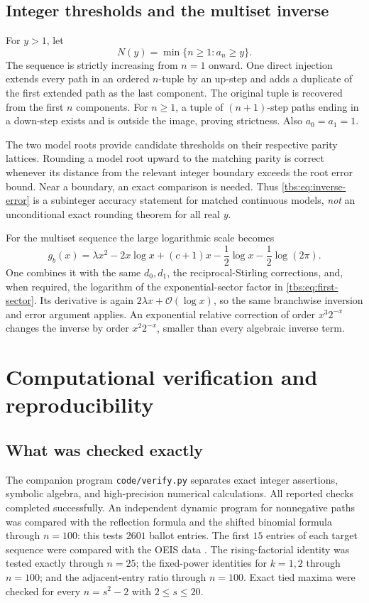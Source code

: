 \documentclass[11pt,a4paper]{article}
\numberwithin{equation}{section}
\theoremstyle{definition}
\newcommand{\OO}{\mathcal O}
\newcommand{\code}[1]{\texttt{#1}}
\begin{document}
\subsection{Integer thresholds and the multiset inverse}
For $y>1$, let
\[
 N(y)=\min\{n\ge1:a_n\ge y\}.
\]
The sequence is strictly increasing from $n=1$ onward. One direct
injection extends every path in an ordered $n$-tuple by an up-step and
adds a duplicate of the first extended path as the last component.
The original tuple is recovered from the first $n$ components. For
$n\ge1$, a tuple of $(n+1)$-step paths ending in a down-step exists and
is outside the image, proving strictness. Also $a_0=a_1=1$.

The two model roots provide candidate thresholds on their respective
parity lattices. Rounding a model root upward to the matching parity is
correct whenever its distance from the relevant integer boundary
exceeds the root error bound. Near a boundary, an exact comparison is
needed. Thus \eqref{tbs:eq:inverse-error} is a subinteger accuracy statement
for matched continuous models, \emph{not} an unconditional exact
rounding theorem for all real $y$.

For the multiset sequence the large logarithmic scale becomes
\begin{equation}\label{tbs:eq:gb}
 g_b(x)=\lambda x^2-2x\log x+(c+1)x
        -\frac12\log x-\frac12\log(2\pi).
\end{equation}
One combines it with the same $d_0,d_1$, the reciprocal-Stirling
corrections, and, when required, the logarithm of the exponential-sector
factor in \eqref{tbs:eq:first-sector}. Its derivative is again
$2\lambda x+\OO(\log x)$, so the same branchwise inversion and error
argument applies. An exponential relative correction of order
$x^3 2^{-x}$ changes the inverse by order $x^2 2^{-x}$, smaller than
every algebraic inverse term.

\section{Computational verification and reproducibility}\label{tbs:sec:computations}

\subsection{What was checked exactly}
The companion program \code{code/verify.py} separates exact integer
assertions, symbolic algebra, and high-precision numerical calculations.
All reported checks completed successfully. An independent dynamic
program for nonnegative paths was compared with the reflection formula
and the shifted binomial formula through $n=100$: this tests $2601$
ballot entries. The first $15$ entries of each target sequence were
compared with the OEIS data \cite{oeisa,oeisb,dataa,datab}.
The rising-factorial identity was tested exactly through $n=25$;
the fixed-power identities for $k=1,2$ through $n=100$; and the
adjacent-entry ratio through $n=100$. Exact tied maxima were checked
for every $n=s^2-2$ with $2\le s\le20$.
\end{document}
